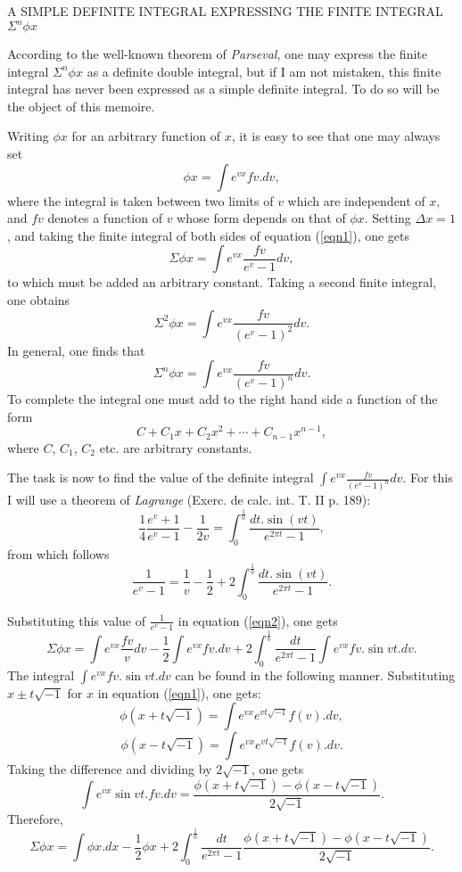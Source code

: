 \documentclass[12pt]{article}
\begin{document}
\begin{center}
A SIMPLE DEFINITE INTEGRAL EXPRESSING THE FINITE INTEGRAL $\Sigma^n \phi x$
\end{center}

According to the well-known theorem of \emph{Parseval}, one may express the finite integral $\Sigma^n \phi x$ as a definite double integral, but if I am not mistaken, this finite integral has never been expressed as a simple definite integral.   To do so will be the object of this memoire.  

Writing $\phi x$ for an arbitrary function of $x$, it is easy to see that one may always set
\begin{equation} \label{eqn1} \phi x = \int e^{vx} fv . dv, \end{equation}
where the integral is taken between two limits of $v$ which are independent of $x$, and $fv$ denotes a function of $v$ whose form depends on that of $\phi x$.  Setting $\Delta x = 1$, and taking the finite integral of both sides of equation (\ref{eqn1}), one gets
\begin{equation} \label{eqn2} \Sigma \phi x = \int e^{vx} \frac{f v}{e^v-1}dv, \end{equation}
to which must be added an arbitrary constant.  Taking a second finite integral, one obtains
\begin{equation} \label{eqn3} \Sigma^2 \phi x = \int e^{vx} \frac{fv}{\left(e^v-1\right)^2} dv. \end{equation}
In general, one finds that
\begin{equation} \label{eqn4} \Sigma^n \phi x = \int e^{vx} \frac{fv}{\left(e^v-1\right)^n} dv . \end{equation}
To complete the integral one must add to the right hand side a function of the form
\[ C + C_1 x + C_2 x^2 + \cdots + C_{n-1} x^{n-1}, \]
where $C$, $C_1$, $C_2$ etc. are arbitrary constants.

The task is now to find the value of the definite integral $\int e^{vx} \frac{fv}{\left(e^v-1\right)^n} dv$.  For this I will use a theorem of \emph{Lagrange} (Exerc. de calc. int. T. II p. 189):
\[ \frac{1}{4} \frac{e^v + 1}{e^v - 1} - \frac{1}{2v} = \int^{\frac{1}{0}}_0 \frac{dt . \sin(vt)}{e^{2\pi t} -1 },\]
from which follows
\[ \frac{1}{e^v -1} = \frac{1}{v} - \frac{1}{2}  + 2 \int_0^{\frac{1}{0}} \frac{dt . \sin(vt)}{e^{2\pi t} -1 }. \]

Substituting this value of $\frac{1}{e^v-1}$ in equation (\ref{eqn2}), one gets
\[ \Sigma \phi x = \int e^{vx} \frac{fv}{v} dv - \frac{1}{2} \int e^{vx} fv . dv + 2 \int_0^{\frac{1}{0}} \frac{dt}{e^{2\pi t} - 1} \int e^{vx} fv. \sin vt . dv .\]
The integral $\int e^{vx} fv.\sin vt . dv$ can be found in the following manner.  Substituting $x \pm t\sqrt{-1}$ for $x$ in equation (\ref{eqn1}), one gets:
\[ \phi(x + t\sqrt{-1}) = \int e^{vx}e^{vt\sqrt{-1}} f(v) . dv , \]
\[ \phi(x - t\sqrt{-1}) = \int e^{vx}e^{vt\sqrt{-1}} f(v) . dv .\]
Taking the difference and dividing by $2 \sqrt{-1}$, one gets
\[ \int e^{vx} \sin vt . fv. dv = \frac{\phi(x+t \sqrt{-1}) - \phi(x - t \sqrt{-1})}{2\sqrt{-1}}. \]
Therefore, 
\[ \Sigma \phi x = \int \phi x. dx - \frac{1}{2} \phi x + 2 \int_0^{\frac{1}{0}} \frac{dt}{e^{2\pi t} - 1} \frac{\phi(x+t \sqrt{-1}) - \phi(x - t \sqrt{-1})}{2\sqrt{-1}} .\]
\end{document}
